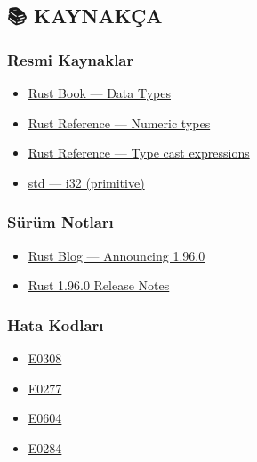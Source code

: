 \documentclass[12pt,a4paper]{article}
\begin{document}
\subsection{📚 KAYNAKÇA}\label{kaynakça-3}

\subsubsection{Resmi Kaynaklar}\label{resmi-kaynaklar-3}

\begin{itemize}
\tightlist
\item
  \href{https://doc.rust-lang.org/book/ch03-02-data-types.html}{Rust Book --- Data Types}
\item
  \href{https://doc.rust-lang.org/reference/types/numeric.html}{Rust Reference --- Numeric types}
\item
  \href{https://doc.rust-lang.org/reference/expressions/operator-expr.html\#type-cast-expressions}{Rust Reference --- Type cast expressions}
\item
  \href{https://doc.rust-lang.org/std/primitive.i32.html}{std --- i32 (primitive)}
\end{itemize}

\subsubsection{Sürüm Notları}\label{sürüm-notları-3}

\begin{itemize}
\tightlist
\item
  \href{https://blog.rust-lang.org/2026/05/28/Rust-1.96.0/}{Rust Blog --- Announcing 1.96.0}
\item
  \href{https://doc.rust-lang.org/stable/releases.html\#version-1960-2026-05-28}{Rust 1.96.0 Release Notes}
\end{itemize}

\subsubsection{Hata Kodları}\label{hata-kodları-3}

\begin{itemize}
\tightlist
\item
  \href{https://doc.rust-lang.org/error_codes/E0308.html}{E0308}
\item
  \href{https://doc.rust-lang.org/error_codes/E0277.html}{E0277}
\item
  \href{https://doc.rust-lang.org/error_codes/E0604.html}{E0604}
\item
  \href{https://doc.rust-lang.org/error_codes/E0284.html}{E0284}
\end{itemize}
\end{document}
